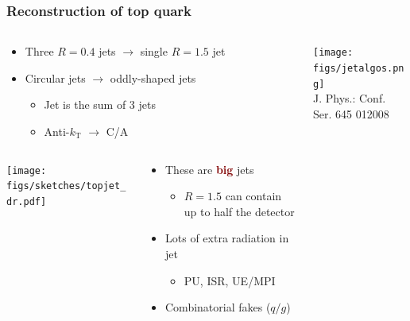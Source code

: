 \documentclass[aspectratio=169,xcolor=dvipsnames,,table,compress]{beamer}
\begin{document}
\begin{frame}[t]   \frametitle{Reconstruction of top quark}
  \vspace{-5mm}
  \begin{columns}
  \begin{column}{0.7\textwidth}
  \begin{itemize}
    \item Three $R=0.4$ jets $\rightarrow$ single $R=1.5$ jet
    \item Circular jets $\rightarrow$ oddly-shaped jets
    \begin{itemize}
      \item Jet is the sum of 3 jets
      \item Anti-$k_\mathrm{T}$ $\rightarrow$ C/A
    \end{itemize}
  \end{itemize}
    \begin{columns}
    \begin{column}{0.35\textwidth}
      \texttt{[image: figs/sketches/topjet\_dr.pdf]}
    \end{column}
    \begin{column}{0.65\textwidth}
  \begin{itemize}
    \item These are \textcolor{maroon}{\bf big} jets
    \begin{itemize}
      \item $R=1.5$ can contain up to half the detector
    \end{itemize}
      \item Lots of extra radiation in jet
      \begin{itemize}
        \item PU, ISR, UE/MPI
      \end{itemize}
      \item Combinatorial fakes ($q/g$)
  \end{itemize}
    \end{column}
    \end{columns}
  \end{column}
  \begin{column}{0.3\textwidth}
    \vspace{-2mm}
    \centering
      \texttt{[image: figs/jetalgos.png]}\\ {\tiny J. Phys.: Conf. Ser. 645 012008}
  \end{column}
  \end{columns}
\end{frame}
\end{document}
